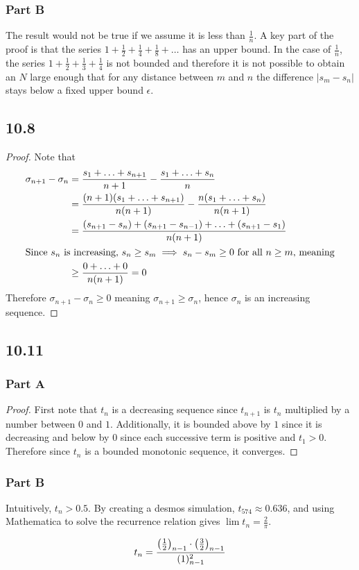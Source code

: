 \documentclass[12pt,titlepage]{extarticle}
\begin{document}
\subsubsection*{Part B}
The result would not be true if we assume it is less than $\frac{1}{n}$. A key part of the proof is that the series $1 + \frac{1}{2} + \frac{1}{4} + \frac{1}{8} + \ldots$ has an upper bound. In the case of $\frac{1}{n}$, the series $1 + \frac{1}{2} + \frac{1}{3} + \frac{1}{4}$ is not bounded and therefore it is not possible to obtain an $N$ large enough that for any distance between $m$ and $n$ the difference $|s_m - s_n|$ stays below a fixed upper bound $\epsilon$.

\subsection*{10.8}
\begin{proof}
    Note that
    \begin{align*}
        \sigma_{n+1} - \sigma_n &= \frac{s_1 + \ldots + s_{n+1}}{n+1} - \frac{s_1 + \ldots + s_n}{n} \\
        &= \frac{(n+1)(s_1 + \ldots + s_{n+1})}{n(n+1)} - \frac{n(s_1 + \ldots + s_n)}{n(n+1)} \\
        &= \frac{(s_{n+1} - s_n) + (s_{n+1} - s_{n-1}) + \ldots + (s_{n+1} - s_1)}{n(n+1)} \\
        \intertext{Since $s_n$ is increasing, $s_n \geq s_m \implies s_n - s_m \geq 0$ for all $n \geq m$, meaning}
        &\geq \frac{0 + \ldots + 0}{n(n+1)} = 0 \\
    \end{align*}
    Therefore $\sigma_{n+1} - \sigma_n \geq 0$ meaning $\sigma_{n+1} \geq \sigma_n$, hence $\sigma_n$ is an increasing sequence.
\end{proof}

\subsection*{10.11}
\subsubsection*{Part A}
\begin{proof}
    First note that $t_n$ is a decreasing sequence since $t_{n+1}$ is $t_n$ multiplied by a number between $0$ and $1$. Additionally, it is bounded above by $1$ since it is decreasing and below by $0$ since each successive term is positive and $t_1 > 0$. Therefore since $t_n$ is a bounded monotonic sequence, it converges.
\end{proof}

\subsubsection*{Part B}
Intuitively, $t_n > 0.5$. By creating a desmos simulation, $t_{574} \approx 0.636$, and using Mathematica to solve the recurrence relation gives $\lim t_n = \frac{2}{\pi}$.

\[
    t_n = \frac{\qty(\frac{1}{2})_{n-1} \cdot \qty(\frac{3}{2})_{n-1}}{(1)_{n-1}^2}
\]
\end{document}
